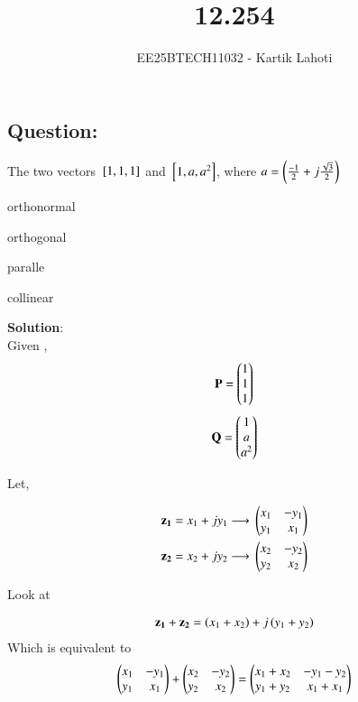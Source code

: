 \documentclass[journal]{IEEEtran}
\numberwithin{equation}{enumi}
\numberwithin{figure}{enumi}
\begin{document}

\vspace{3cm}

\title{12.254}
\author{EE25BTECH11032 - Kartik Lahoti}
\maketitle

\subsection*{Question: } 

The two vectors ${}\left[1,1,1\right]$ and ${}\left[1,a,a^2\right]$, where $a = \left(\frac{-1}{2} + j\frac{\sqrt{3}}{2}\right)$

\begin{enumerate}
    \begin{multicols}{4}
        \item orthonormal
        \item orthogonal
        \item paralle
        \item collinear
    \end{multicols}
\end{enumerate}

\textbf{Solution}:\\

Given , 
\begin{align}
    \mathbf{P} = \begin{pmatrix}1\\1\\1\end{pmatrix} 
\end{align}
\begin{align}
    \mathbf{Q} = \begin{pmatrix}1\\a\\a^2\end{pmatrix} 
\end{align}

Let,

\begin{align}
    \mathbf{z_1}=x_1+jy_1 \longrightarrow{} \begin{pmatrix}x_1 & -y_1 \\ y_1 & x_1 \end{pmatrix}\\ 
    \mathbf{z_2}=x_2+jy_2 \longrightarrow{} \begin{pmatrix}x_2 & -y_2 \\ y_2 & x_2 \end{pmatrix} 
\end{align}

Look at 

\begin{align} 
    \mathbf{z_1} + \mathbf{z_2} = \left(x_1+x_2\right) + j \left(y_1 + y_2\right)
\end{align}
Which is equivalent to 
\begin{align}
    \begin{pmatrix}x_1 & -y_1 \\ y_1 & x_1 \end{pmatrix} + \begin{pmatrix}x_2 & -y_2 \\ y_2 & x_2 \end{pmatrix} = \begin{pmatrix}x_1+x_2 & -y_1-y_2 \\ y_1+y_2 & x_1+x_1\end{pmatrix}
\end{align}
\end{document}
